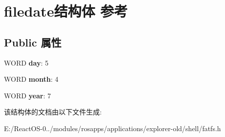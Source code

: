 \hypertarget{structfiledate}{}\section{filedate结构体 参考}
\label{structfiledate}
\subsection*{Public 属性}
\begin{DoxyCompactItemize}
\item 
\mbox{\label{structfiledate_adf69ed413ffaeb99e1fb1933af9b1dde}} 
W\+O\+RD {\bfseries day}\+: 5
\item 
\mbox{\label{structfiledate_ab5dbb8b431623af883b6c6201a905171}} 
W\+O\+RD {\bfseries month}\+: 4
\item 
\mbox{\label{structfiledate_a8c76c7a451a2a298ed15321e72e89b6d}} 
W\+O\+RD {\bfseries year}\+: 7
\end{DoxyCompactItemize}


该结构体的文档由以下文件生成\+:\begin{DoxyCompactItemize}
\item 
E\+:/\+React\+O\+S-\/0../modules/rosapps/applications/explorer-\/old/shell/fatfs.\+h\end{DoxyCompactItemize}

